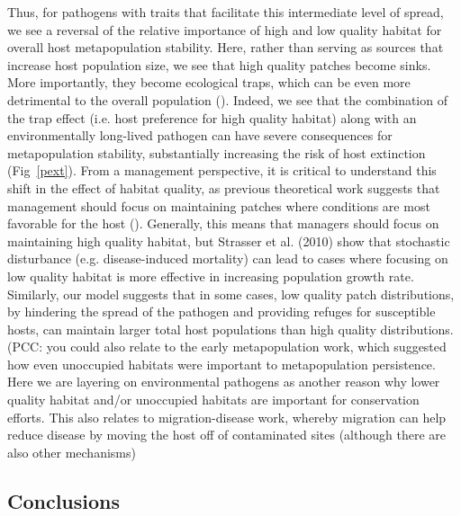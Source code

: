 \documentclass{article}
\begin{document}
Thus, for pathogens with traits that facilitate this intermediate level of spread, we see a reversal of the relative importance of high and low quality habitat for overall host metapopulation stability.
Here, rather than serving as sources that increase host population size, we see that high quality patches become sinks.  
More importantly, they become ecological traps, which can be even more detrimental to the overall population (\cite{Kristan2003}).  
Indeed, we see that the combination of the trap effect (i.e. host preference for high quality habitat) along with an environmentally long-lived pathogen can have severe consequences for metapopulation stability, substantially increasing the risk of host extinction (Fig~\ref{pext}).
From a management perspective, it is critical to understand this shift in the effect of habitat quality, as previous theoretical work suggests that management should focus on maintaining patches where conditions are most favorable for the host (\cite{Strasser2010}). 
Generally, this means that managers should focus on maintaining high quality habitat, but Strasser et al. (2010) show that stochastic disturbance (e.g. disease-induced mortality) can lead to cases where focusing on low quality habitat is more effective in increasing population growth rate.
Similarly, our model suggests that in some cases, low quality patch distributions, by hindering the spread of the pathogen and providing refuges for susceptible hosts, can maintain larger total host populations than high quality distributions.  (PCC: you could also relate to the early metapopulation work, which suggested how even unoccupied habitats were important to metapopulation persistence.  Here we are layering on environmental pathogens as another reason why lower quality habitat and/or unoccupied habitats are important for conservation efforts. This also relates to migration-disease work, whereby migration can help reduce disease by moving the host off of contaminated sites (although there are also other mechanisms)


\subsection*{Conclusions}  
\end{document}
